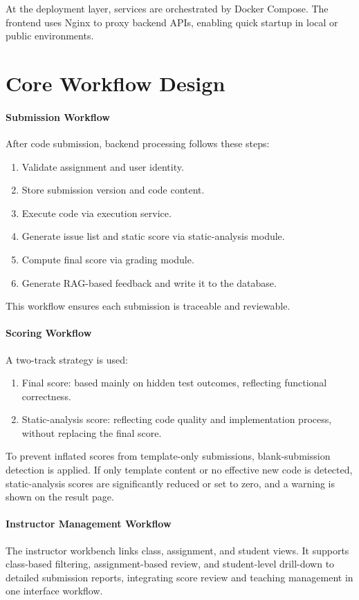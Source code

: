 At the deployment layer, services are orchestrated by Docker Compose. The frontend uses Nginx to proxy backend APIs, enabling quick startup in local or public environments.

\section{Core Workflow Design}


\paragraph{Submission Workflow}
After code submission, backend processing follows these steps:

\begin{enumerate}
\item Validate assignment and user identity.
\item Store submission version and code content.
\item Execute code via execution service.
\item Generate issue list and static score via static-analysis module.
\item Compute final score via grading module.
\item Generate RAG-based feedback and write it to the database.
\end{enumerate}


This workflow ensures each submission is traceable and reviewable.

\paragraph{Scoring Workflow}
A two-track strategy is used:

\begin{enumerate}
\item Final score: based mainly on hidden test outcomes, reflecting functional correctness.
\item Static-analysis score: reflecting code quality and implementation process, without replacing the final score.
\end{enumerate}


To prevent inflated scores from template-only submissions, blank-submission detection is applied. If only template content or no effective new code is detected, static-analysis scores are significantly reduced or set to zero, and a warning is shown on the result page.

\paragraph{Instructor Management Workflow}
The instructor workbench links class, assignment, and student views. It supports class-based filtering, assignment-based review, and student-level drill-down to detailed submission reports, integrating score review and teaching management in one interface workflow.

